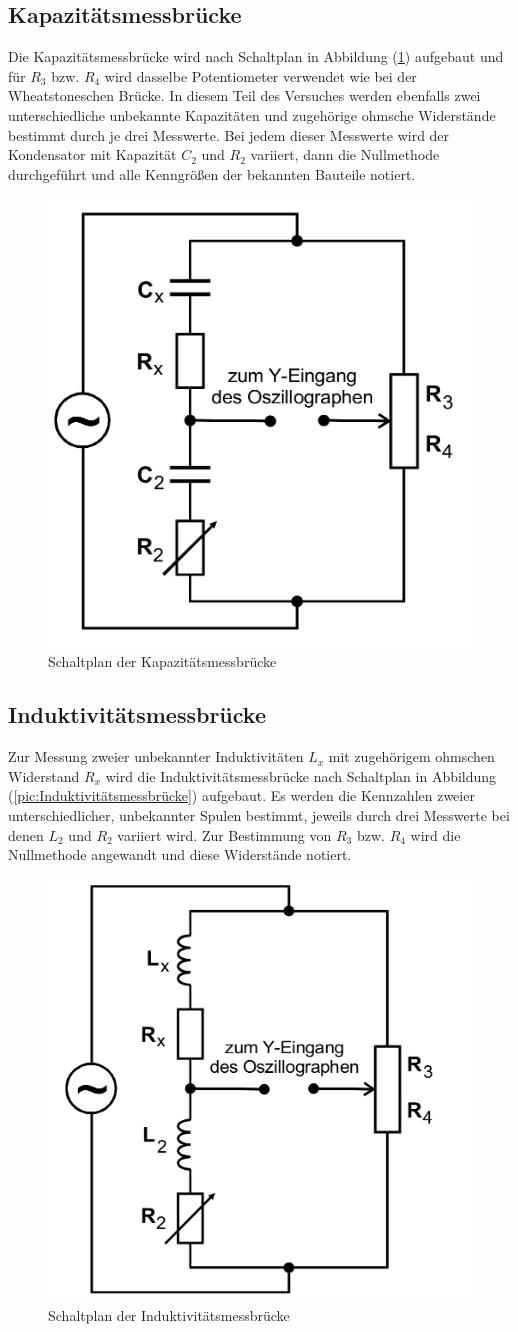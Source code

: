 \subsection{Kapazitätsmessbrücke}
Die Kapazitätsmessbrücke wird nach Schaltplan in Abbildung (\ref{pic:Kapazitaetsmessbruecke}) aufgebaut und für $R_3$ bzw. $R_4$ wird dasselbe Potentiometer
verwendet wie bei der Wheatstoneschen Brücke. In diesem Teil des Versuches werden ebenfalls zwei unterschiedliche unbekannte Kapazitäten und zugehörige 
ohmsche Widerstände bestimmt durch je drei Messwerte. Bei jedem dieser Messwerte wird der Kondensator mit Kapazität $C_2$ und $R_2$ variiert, dann die Nullmethode durchgeführt und alle Kenngrößen
der bekannten Bauteile notiert. 
\begin{figure}[H]
    \centering
    \includegraphics[width=0.4\linewidth]{Kapazitaet.png}
    \caption{Schaltplan der Kapazitätsmessbrücke}
    \label{pic:Kapazitaetsmessbruecke}
\end{figure}
\subsection{Induktivitätsmessbrücke}
Zur Messung zweier unbekannter Induktivitäten $L_x$ mit zugehörigem ohmschen Widerstand $R_x$ wird die Induktivitätsmessbrücke nach Schaltplan in Abbildung 
(\ref{pic:Induktivitätsmessbrücke}) aufgebaut. Es werden die Kennzahlen zweier unterschiedlicher, unbekannter Spulen bestimmt, jeweils durch drei Messwerte bei 
denen $L_2$ und $R_2$ variiert wird. Zur Bestimmung von $R_3$ bzw. $R_4$ wird die Nullmethode angewandt und diese Widerstände notiert. 
\begin{figure}[H]
    \centering
    \includegraphics[width=0.4\linewidth]{Induktivitaet.png}
    \caption{Schaltplan der Induktivitätsmessbrücke}
    \label{pic:Induktivitaetsmessbruecke}
\end{figure} 
